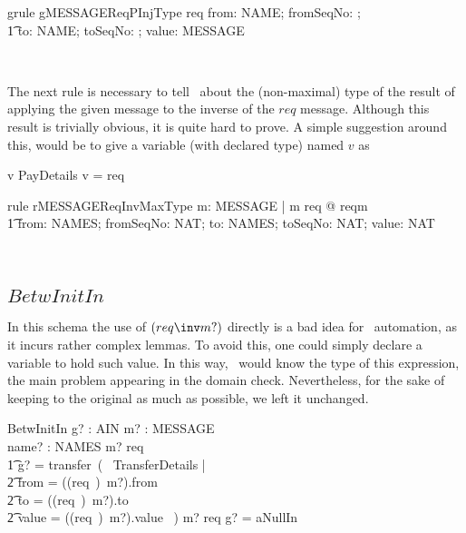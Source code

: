 \begin{LGRT}
\begin{theorem}{grule gMESSAGEReqPInjType}
   req \in \lblot from: NAME; fromSeqNo: \nat; \\
        \t1 to: NAME; toSeqNo: \nat; value: \nat \rblot \pinj MESSAGE
\end{theorem}~\end{LGRT}

The next rule is necessary to tell \zeves\ about the (non-maximal) type of the result of
applying the given message to the inverse of the $req$ message. Although this result is trivially
obvious, it is quite hard to prove. A simple suggestion around this, would be to give a variable
(with declared type) named $v$ as
%
\begin{gzed}
    v \in PayDetails \land v = req\inv
\end{gzed}
%
\begin{LRRT}
\begin{theorem}{rule rMESSAGEReqInvMaxType}
   \forall m: MESSAGE | m \in \ran req @ req\inv m \in \\ \t1
      \lblot from: NAMES; fromSeqNo: NAT; to: NAMES; toSeqNo: NAT; value: NAT \rblot
\end{theorem}~\end{LRRT}

\subsection*{$BetwInitIn$}

In this schema the use of $(req\inv m?)$ directly is a bad idea for \zeves\ automation,
as it incurs rather complex lemmas. To avoid this, one could simply declare a variable
to hold such value. In this way, \zeves\ would know the type of this expression, the main
problem appearing in the domain check. Nevertheless, for the sake of keeping to the original
as much as possible, we left it unchanged.
%
\begin{LSDef}
\begin{schema}{BetwInitIn}
  g? : AIN
  \also
  m? : MESSAGE
  \\    name? : NAMES
  \where
  m? \in \ran req \implies
  \\ \t1                g? = transfer~(~ \mu TransferDetails |
  \\ \t2                        from = ((req~\inv)~m?).from
  \\ \t2                        \land to = ((req~\inv)~m?).to
  \\ \t2                        \land value = ((req~\inv)~m?).value ~)
  \also
  m? \notin \ran req
  \implies
  g? = aNullIn
\end{schema}~\end{LSDef}

